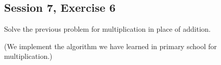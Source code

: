 \subsection {Session 7, Exercise 6}


Solve the previous problem for multiplication in place of addition.


(We implement the algorithm we have learned in primary school for multiplication.)